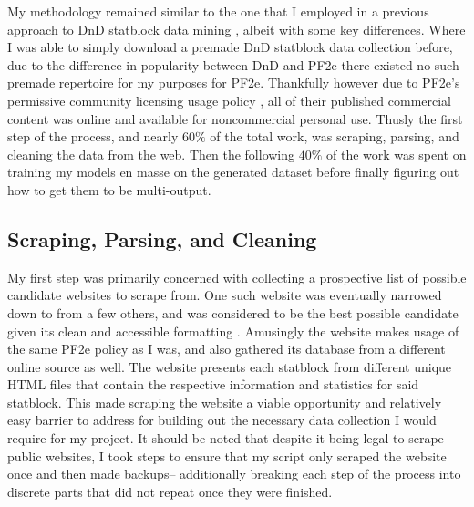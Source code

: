 \documentclass[11pt]{article}
\begin{document}
My methodology remained similar to the one that I employed in a previous approach to DnD statblock data mining \cite{vess-dev_2022}, albeit with some key differences. Where I was able to simply download a premade DnD statblock data collection before, due to the difference in popularity between DnD and PF2e there existed no such premade repertoire for my purposes for PF2e. Thankfully however due to PF2e's permissive community licensing usage policy \cite{use_2020}, all of their published commercial content was online and available for noncommercial personal use. Thusly the first step of the process, and nearly $60\%$ of the total work, was scraping, parsing, and cleaning the data from the web. Then the following $40\%$ of the work was spent on training my models en masse on the generated dataset before finally figuring out how to get them to be multi-output.

\subsection{Scraping, Parsing, and Cleaning}

My first step was primarily concerned with collecting a prospective list of possible candidate websites to scrape from. One such website was eventually narrowed down to from a few others, and was considered to be the best possible candidate given its clean and accessible formatting \cite{hemerik}. Amusingly the website makes usage of the same PF2e policy as I was, and also gathered its database from a different online source as well. The website presents each statblock from different unique HTML files that contain the respective information and statistics for said statblock. This made scraping the website a viable opportunity and relatively easy barrier to address for building out the necessary data collection I would require for my project. It should be noted that despite it being legal to scrape public websites, I took steps to ensure that my script only scraped the website once and then made backups-- additionally breaking each step of the process into discrete parts that did not repeat once they were finished.
\end{document}
